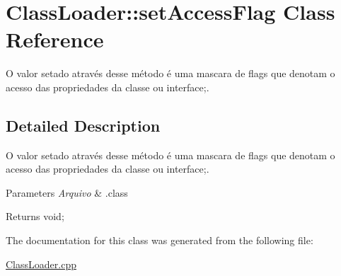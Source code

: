 \hypertarget{class_class_loader_1_1set_access_flag}{}\section{Class\+Loader\+:\+:set\+Access\+Flag Class Reference}
\label{class_class_loader_1_1set_access_flag}


O valor setado através desse método é uma mascara de flags que denotam o acesso das propriedades da classe ou interface;.  




\subsection{Detailed Description}
O valor setado através desse método é uma mascara de flags que denotam o acesso das propriedades da classe ou interface;. 


\begin{DoxyParams}{Parameters}
{\em Arquivo} & .class \\
\hline
\end{DoxyParams}
\begin{DoxyReturn}{Returns}
void; 
\end{DoxyReturn}


The documentation for this class was generated from the following file\+:\begin{DoxyCompactItemize}
\item 
\hyperlink{_class_loader_8cpp}{Class\+Loader.\+cpp}\end{DoxyCompactItemize}
